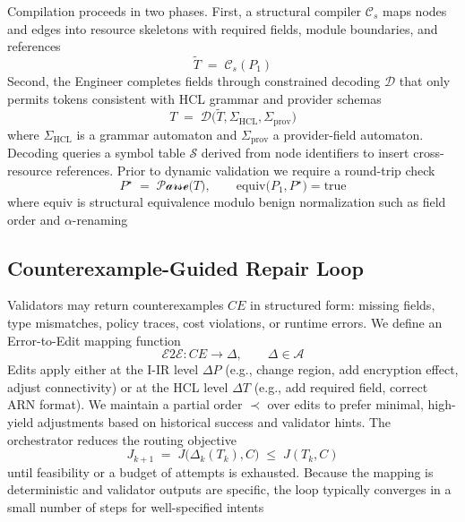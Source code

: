 \documentclass[acmsmall,screen,review,anonymous]{acmart}
\begin{document}
Compilation proceeds in two phases. First, a structural compiler $\mathcal{C}_s$ maps nodes and edges into resource skeletons with required fields, module boundaries, and references
\begin{equation}
\widetilde{T} \;=\; \mathcal{C}_s(P_1)
\end{equation}
Second, the Engineer completes fields through constrained decoding $\mathcal{D}$ that only permits tokens consistent with HCL grammar and provider schemas
\begin{equation}
T \;=\; \mathcal{D}\big(\widetilde{T}, \Sigma_{\text{HCL}}, \Sigma_{\text{prov}}\big)
\end{equation}
where $\Sigma_{\text{HCL}}$ is a grammar automaton and $\Sigma_{\text{prov}}$ a provider-field automaton. Decoding queries a symbol table $\mathcal{S}$ derived from node identifiers to insert cross-resource references. Prior to dynamic validation we require a round-trip check
\begin{equation}
P^\star \;=\; \mathcal{P\!arse}\big(T\big),\qquad \mathrm{equiv}\big(P_1, P^\star\big) = \text{true}
\end{equation}
where $\mathrm{equiv}$ is structural equivalence modulo benign normalization such as field order and $\alpha$-renaming

\subsection{Counterexample-Guided Repair Loop}
\label{sec:repair}

Validators may return counterexamples $CE$ in structured form: missing fields, type mismatches, policy traces, cost violations, or runtime errors. We define an Error-to-Edit mapping function
\begin{equation}
\mathcal{E2E}: CE \rightarrow \Delta,\qquad \Delta \in \mathcal{A}
\end{equation}
Edits apply either at the I-IR level $\Delta P$ (e.g., change region, add encryption effect, adjust connectivity) or at the HCL level $\Delta T$ (e.g., add required field, correct ARN format). We maintain a partial order $\prec$ over edits to prefer minimal, high-yield adjustments based on historical success and validator hints. The orchestrator reduces the routing objective
\begin{equation}
J_{k+1} \;=\; J\big(\Delta_k(T_k), C\big) \;\le\; J(T_k, C)
\end{equation}
until feasibility or a budget of attempts is exhausted. Because the mapping is deterministic and validator outputs are specific, the loop typically converges in a small number of steps for well-specified intents
\end{document}

